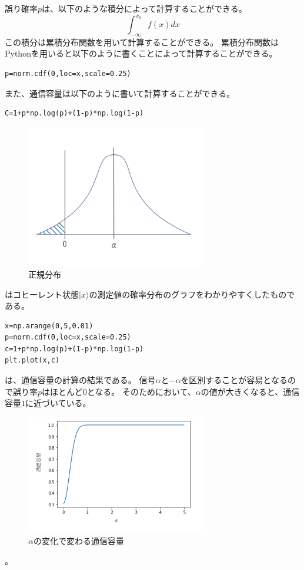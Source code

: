誤り確率$p$は、以下のような積分によって計算することができる。
$$
\int_{-\infty}^{x_0}f(x)dx
$$この積分は累積分布関数を用いて計算することができる。
累積分布関数はPythonを用いると以下のように書くことによって計算することができる。

\begin{lstlisting}[caption=累積分布関数]
p=norm.cdf(0,loc=x,scale=0.25)
\end{lstlisting}

また、通信容量は以下のように書いて計算することができる。

\begin{lstlisting}[caption=通信容量]
C=1+p*np.log(p)+(1-p)*np.log(1-p)
\end{lstlisting}


    \begin{figure}[H]
        \centering   
        \includegraphics[width=0.7\textwidth]{img/Fig4.png}
         \caption[sample image (png)]{正規分布}
        \label{Fig4_2}
    \end{figure}

はコヒーレント状態$|x\rangle$の測定値の確率分布のグラフをわかりやすくしたものである。


\begin{lstlisting}[caption=αの変化で変わる通信容量]
x=np.arange(0,5,0.01)
p=norm.cdf(0,loc=x,scale=0.25)
c=1+p*np.log(p)+(1-p)*np.log(1-p)
plt.plot(x,c)
\end{lstlisting}
は、通信容量の計算の結果である。
信号$\alpha$と$-\alpha$を区別することが容易となるので誤り率$p$はほとんど$0$となる。
そのためにおいて、$\alpha$の値が大きくなると、通信容量$1$に近づいている。

    \begin{figure}[H]
        \centering   
        \includegraphics[width=0.7\textwidth]{img/Fig5.png}
        \caption[sample image (png)]{$\alpha$の変化で変わる通信容量}
        \label{Fig4_3}
    \end{figure}
。
    

